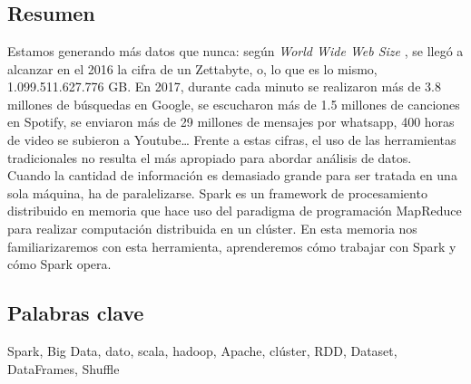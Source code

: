 \chapter*{}


\section*{Resumen}
\leftmark{} 
\rightmark{} 

Estamos generando más datos que nunca: según \textit{World Wide Web Size} \cite{wwws}, se llegó a alcanzar en el 2016 la cifra de un Zettabyte, o, lo que es lo mismo, 1.099.511.627.776 GB. En 2017, durante cada minuto se realizaron más de 3.8 millones de búsquedas en Google, se escucharon más de 1.5 millones de canciones en Spotify, se enviaron más de 29 millones de mensajes por whatsapp, 400 horas de video se subieron a Youtube… Frente a estas cifras, el uso de las herramientas tradicionales no resulta el más apropiado para abordar análisis de datos.\\

Cuando la cantidad de información es demasiado grande para ser tratada en una sola máquina, ha de paralelizarse. Spark es un framework de procesamiento distribuido en memoria que hace uso del paradigma de programación MapReduce para realizar computación distribuida en un clúster. En esta memoria nos familiarizaremos con esta herramienta, aprenderemos cómo trabajar con Spark y cómo Spark opera. 



{\setlength{\parskip}{30mm}
\section*{Palabras clave}
}
Spark, Big Data, dato, scala, hadoop, Apache, clúster, RDD, Dataset, 
DataFrames, Shuffle
